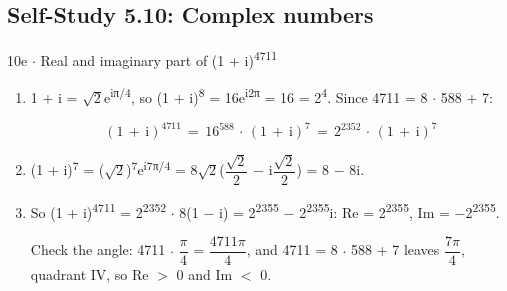 \documentclass[11pt]{article}
\begin{document}
\begin{keepsection}\subsection{Self-Study 5.10: Complex numbers}

\begin{workedbox}{10e \ensuremath{\cdot} Real and imaginary part of (1 + i)\textsuperscript{4711}}
\begin{enumerate}
\item {}
1 + i = \ensuremath{\sqrt{2}}e\textsuperscript{iπ/4}, so (1 + i)\textsuperscript{8} = 16e\textsuperscript{i2π} = 16 = 2\textsuperscript{4}. Since 4711 = 8 \ensuremath{\cdot} 588 + 7:

\begin{equation*}(1\, +\, \mathrm{i})^{4711}\, =\, 16^{588}\, \cdot \, (1\, +\, \mathrm{i})^{7}\, =\, 2^{2352}\, \cdot \, (1\, +\, \mathrm{i})^{7}\end{equation*}
\item (1 + i)\textsuperscript{7} = (\ensuremath{\sqrt{2}})\textsuperscript{7}e\textsuperscript{i7π/4} = 8\ensuremath{\sqrt{2}}({\small\ensuremath{\dfrac{\sqrt{2}}{2}}} \ensuremath{-} i{\small\ensuremath{\dfrac{\sqrt{2}}{2}}}) = 8 \ensuremath{-} 8i.
\item {}
So (1 + i)\textsuperscript{4711} = 2\textsuperscript{2352} \ensuremath{\cdot} 8(1 \ensuremath{-} i) = 2\textsuperscript{2355} \ensuremath{-} 2\textsuperscript{2355}i: Re = 2\textsuperscript{2355}, Im = \ensuremath{-}2\textsuperscript{2355}.

Check the angle: 4711 \ensuremath{\cdot} {\small\ensuremath{\dfrac{π}{4}}} = {\small\ensuremath{\dfrac{4711π}{4}}}, and 4711 = 8 \ensuremath{\cdot} 588 + 7 leaves {\small\ensuremath{\dfrac{7π}{4}}}, quadrant IV, so Re \ensuremath{>} 0 and Im \ensuremath{<} 0.
\end{enumerate}
\end{workedbox}

\end{keepsection}
\end{document}
